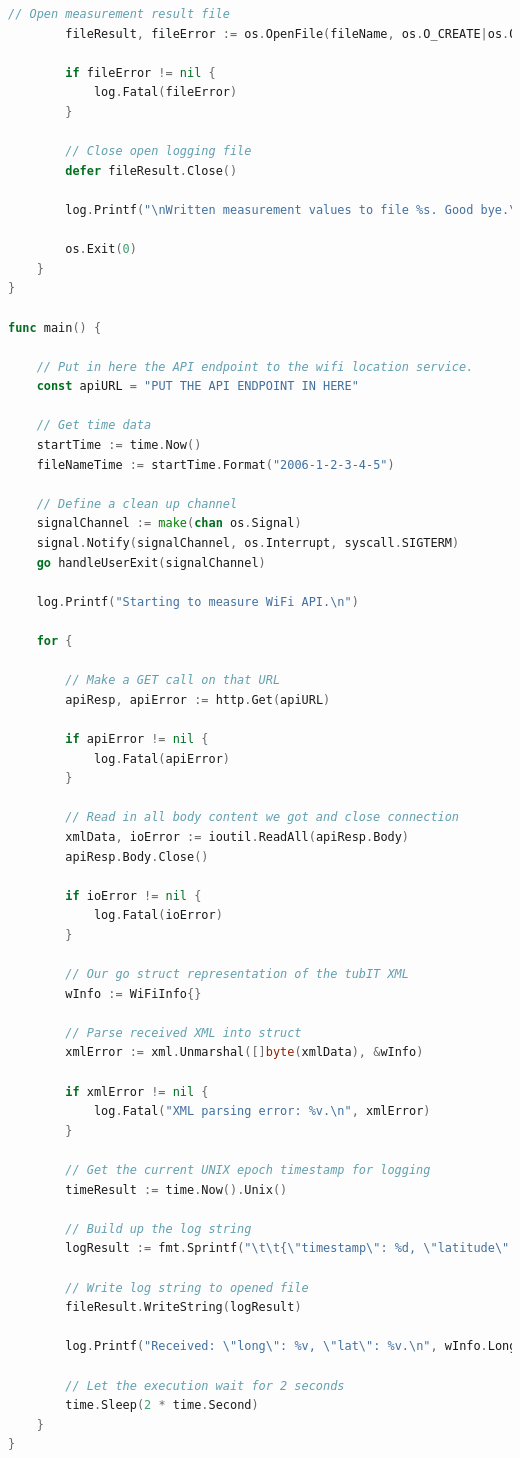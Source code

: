 \documentclass[twoside,11pt,titlepage,a4paper,english,bibliography=totocnumbered,listof=numbered]{scrbook}
\begin{document}
\begin{appendices}
\begin{lstlisting}[language=go]
        // Open measurement result file
        fileResult, fileError := os.OpenFile(fileName, os.O_CREATE|os.O_RDWR|os.O_APPEND, 0666)

        if fileError != nil {
            log.Fatal(fileError)
        }

        // Close open logging file
        defer fileResult.Close()

        log.Printf("\nWritten measurement values to file %s. Good bye.\n", fileName)

        os.Exit(0)
    }
}

func main() {

    // Put in here the API endpoint to the wifi location service.
    const apiURL = "PUT THE API ENDPOINT IN HERE"

    // Get time data
    startTime := time.Now()
    fileNameTime := startTime.Format("2006-1-2-3-4-5")

    // Define a clean up channel
    signalChannel := make(chan os.Signal)
    signal.Notify(signalChannel, os.Interrupt, syscall.SIGTERM)
    go handleUserExit(signalChannel)

    log.Printf("Starting to measure WiFi API.\n")

    for {

        // Make a GET call on that URL
        apiResp, apiError := http.Get(apiURL)

        if apiError != nil {
            log.Fatal(apiError)
        }

        // Read in all body content we got and close connection
        xmlData, ioError := ioutil.ReadAll(apiResp.Body)
        apiResp.Body.Close()

        if ioError != nil {
            log.Fatal(ioError)
        }

        // Our go struct representation of the tubIT XML
        wInfo := WiFiInfo{}

        // Parse received XML into struct
        xmlError := xml.Unmarshal([]byte(xmlData), &wInfo)

        if xmlError != nil {
            log.Fatal("XML parsing error: %v.\n", xmlError)
        }

        // Get the current UNIX epoch timestamp for logging
        timeResult := time.Now().Unix()

        // Build up the log string
        logResult := fmt.Sprintf("\t\t{\"timestamp\": %d, \"latitude\": \"%.15f\", \"longitude\": \"%.15f\", \"building\": \"%s\", \"floor\": \"%s\"},\n", timeResult, wInfo.Latitude, wInfo.Longitude, wInfo.Building, wInfo.Floor)

        // Write log string to opened file
        fileResult.WriteString(logResult)

        log.Printf("Received: \"long\": %v, \"lat\": %v.\n", wInfo.Longitude, wInfo.Latitude)

        // Let the execution wait for 2 seconds
        time.Sleep(2 * time.Second)
    }
}
\end{lstlisting}

\end{appendices}
\end{document}
